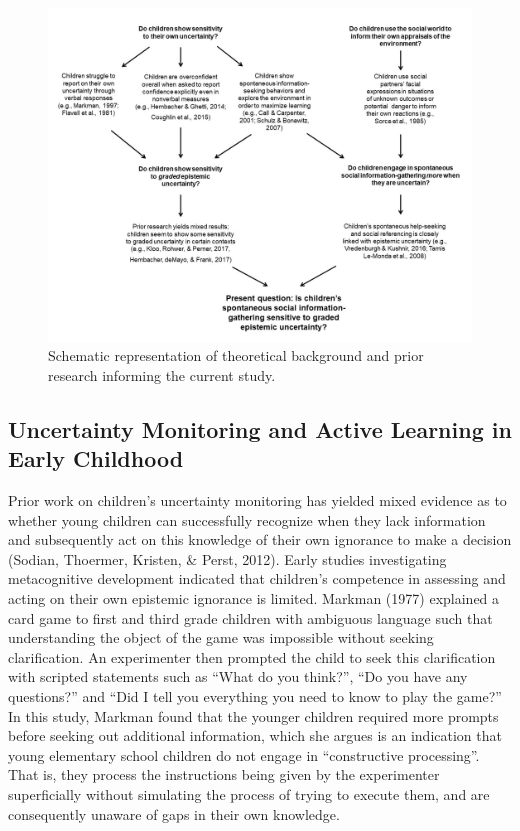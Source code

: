 \documentclass[floatsintext,man]{apa6}
\theoremstyle{definition}
\theoremstyle{definition}
\theoremstyle{definition}
\theoremstyle{remark}
\begin{document}
\begin{figure}

{\centering \includegraphics{../images/diagram_lit_review_1} 

}

\caption{Schematic representation of theoretical background and prior research informing the current study.}\label{fig:schematic}
\end{figure}

\subsection{Uncertainty Monitoring and Active Learning in Early
Childhood}\label{uncertainty-monitoring-and-active-learning-in-early-childhood}

Prior work on children's uncertainty monitoring has yielded mixed
evidence as to whether young children can successfully recognize when
they lack information and subsequently act on this knowledge of their
own ignorance to make a decision (Sodian, Thoermer, Kristen, \& Perst,
2012). Early studies investigating metacognitive development indicated
that children's competence in assessing and acting on their own
epistemic ignorance is limited. Markman (1977) explained a card game to
first and third grade children with ambiguous language such that
understanding the object of the game was impossible without seeking
clarification. An experimenter then prompted the child to seek this
clarification with scripted statements such as \enquote{What do you
think?}, \enquote{Do you have any questions?} and \enquote{Did I tell
you everything you need to know to play the game?} In this study,
Markman found that the younger children required more prompts before
seeking out additional information, which she argues is an indication
that young elementary school children do not engage in
\enquote{constructive processing}. That is, they process the
instructions being given by the experimenter superficially without
simulating the process of trying to execute them, and are consequently
unaware of gaps in their own knowledge.
\end{document}
